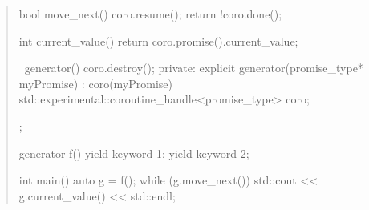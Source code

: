 \begin{quote}
\begin{codeblock}
{    bool move_next() {
      coro.resume();
      return !coro.done();
    }
    
    int current_value() { return coro.promise().current_value; }
    
    ~generator() { coro.destroy(); }
  private:
    explicit generator(promise_type* myPromise) : coro(myPromise) 
    {
    }
    std::experimental::coroutine_handle<promise_type> coro;
  };
  
  generator f() {
    yield-keyword 1;
    yield-keyword 2;
  } 
  
  int main() {
    auto g = f();
    while (g.move_next()) std::cout << g.current_value() << std::endl;
  }
  
\end{codeblock}
\exitexample

\end{quote}
